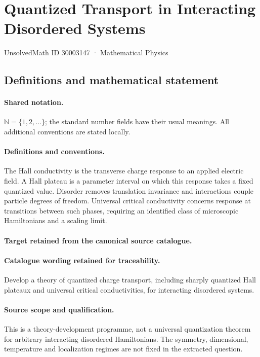 \documentclass[11pt]{article}
\begin{document}
\setcounter{section}{30003146}
\section{Quantized Transport in Interacting Disordered Systems}\label{30003147}
{\small UnsolvedMath ID 30003147 · Mathematical Physics}
\subsection{Definitions and mathematical statement}

\paragraph{Shared notation.}$\mathbb N=\{1,2,\ldots\}$; the standard number fields have their usual meanings. All additional conventions are stated locally.


\paragraph{Definitions and conventions.}
The Hall conductivity is the transverse charge response to an applied electric field. A Hall plateau is a parameter interval on which this response takes a fixed quantized value. Disorder removes translation invariance and interactions couple particle degrees of freedom. Universal critical conductivity concerns response at transitions between such phases, requiring an identified class of microscopic Hamiltonians and a scaling limit.

\paragraph{Target retained from the canonical source catalogue.}
\paragraph{Catalogue wording retained for traceability.}
Develop a theory of quantized charge transport, including sharply quantized Hall plateaux and universal critical conductivities, for interacting disordered systems.

\paragraph{Source scope and qualification.}
This is a theory-development programme, not a universal quantization theorem for arbitrary interacting disordered Hamiltonians. The symmetry, dimensional, temperature and localization regimes are not fixed in the extracted question.
\end{document}
